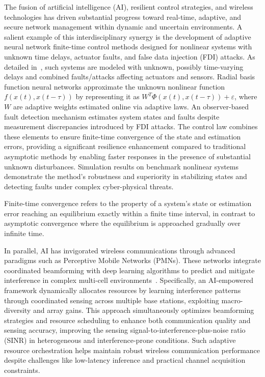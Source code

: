 \documentclass[sigconf]{acmart}
\begin{document}
The fusion of artificial intelligence (AI), resilient control strategies, and wireless technologies has driven substantial progress toward real-time, adaptive, and secure network management within dynamic and uncertain environments. A salient example of this interdisciplinary synergy is the development of adaptive neural network finite-time control methods designed for nonlinear systems with unknown time delays, actuator faults, and false data injection (FDI) attacks. As detailed in~\cite{ref46}, such systems are modeled with unknown, possibly time-varying delays and combined faults/attacks affecting actuators and sensors. Radial basis function neural networks approximate the unknown nonlinear function $f(x(t), x(t-\tau))$ by representing it as $W^T \Phi(x(t), x(t-\tau)) + \varepsilon$, where $W$ are adaptive weights estimated online via adaptive laws. An observer-based fault detection mechanism estimates system states and faults despite measurement discrepancies introduced by FDI attacks. The control law combines these elements to ensure finite-time convergence of the state and estimation errors, providing a significant resilience enhancement compared to traditional asymptotic methods by enabling faster responses in the presence of substantial unknown disturbances. Simulation results on benchmark nonlinear systems demonstrate the method’s robustness and superiority in stabilizing states and detecting faults under complex cyber-physical threats.

\begin{definition}
Finite-time convergence refers to the property of a system's state or estimation error reaching an equilibrium exactly within a finite time interval, in contrast to asymptotic convergence where the equilibrium is approached gradually over infinite time.
\end{definition}

In parallel, AI has invigorated wireless communications through advanced paradigms such as Perceptive Mobile Networks (PMNs). These networks integrate coordinated beamforming with deep learning algorithms to predict and mitigate interference in complex multi-cell environments~\cite{ref47}. Specifically, an AI-empowered framework dynamically allocates resources by learning interference patterns through coordinated sensing across multiple base stations, exploiting macro-diversity and array gains. This approach simultaneously optimizes beamforming strategies and resource scheduling to enhance both communication quality and sensing accuracy, improving the sensing signal-to-interference-plus-noise ratio (SINR) in heterogeneous and interference-prone conditions. Such adaptive resource orchestration helps maintain robust wireless communication performance despite challenges like low-latency inference and practical channel acquisition constraints.
\end{document}
